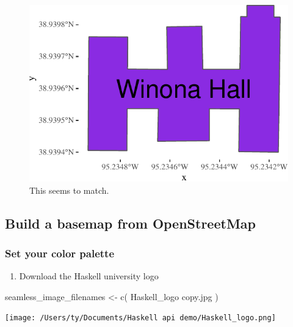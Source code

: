 \documentclass[
  paper=a4,
  ,captions=tableheading
]{scrartcl}
\newenvironment{Shaded}{\begin{snugshade}}{\end{snugshade}}
\newcommand{\FunctionTok}[1]{\textcolor[rgb]{0.00,0.00,0.00}{#1}}
\newcommand{\NormalTok}[1]{#1}
\newcommand{\OtherTok}[1]{\textcolor[rgb]{0.56,0.35,0.01}{#1}}
\newcommand{\StringTok}[1]{\textcolor[rgb]{0.31,0.60,0.02}{#1}}
\providecommand{\tightlist}{%
  \setlength{\itemsep}{0pt}\setlength{\parskip}{0pt}}
\begin{document}
\begin{figure}
\centering
\includegraphics{Haskell_files/figure-latex/unnamed-chunk-9-1.pdf}
\caption{This seems to match.}
\end{figure}

\hypertarget{build-a-basemap-from-openstreetmap}{%
\subsection{Build a basemap from
OpenStreetMap}\label{build-a-basemap-from-openstreetmap}}

\hypertarget{set-your-color-palette}{%
\subsubsection{Set your color palette}\label{set-your-color-palette}}

\begin{enumerate}
\def\labelenumi{\arabic{enumi}.}
\tightlist
\item
  Download the Haskell university logo
\end{enumerate}

\begin{Shaded}
\begin{Highlighting}[]
\NormalTok{seamless\_image\_filenames }\OtherTok{\textless{}{-}} \FunctionTok{c}\NormalTok{(}
  \StringTok{\textquotesingle{}Haskell\_logo copy.jpg\textquotesingle{}}
\NormalTok{)}
\end{Highlighting}
\end{Shaded}

\texttt{[image: /Users/ty/Documents/Haskell api demo/Haskell\_logo.png]}
\end{document}
